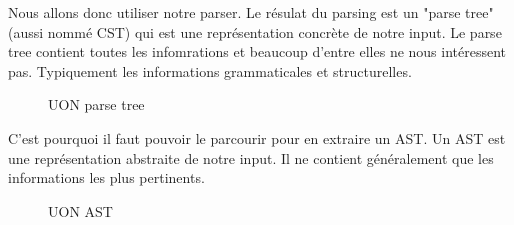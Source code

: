 \documentclass[
    iict, %
    il, %
]{heig-tb}
\begin{document}
Nous allons donc utiliser notre parser.
Le résulat du parsing est un "parse tree" (aussi nommé CST) qui est une représentation concrète de notre input. Le parse tree contient toutes les infomrations et beaucoup d'entre elles ne nous intéressent pas.
Typiquement les informations grammaticales et structurelles.

\begin{figure}[!h]
    \begin{center}
    \end{center}
    \caption[UON parse tree]{\label{parse-tree} UON parse tree}
\end{figure}

C'est pourquoi il faut pouvoir le parcourir pour en extraire un AST.
Un AST est une représentation abstraite de notre input. Il ne contient généralement que les informations les plus pertinents.

\begin{figure}[!h]
    \begin{center}
    \end{center}
    \caption[UON AST]{\label{ast} UON AST}
\end{figure}
\end{document}
